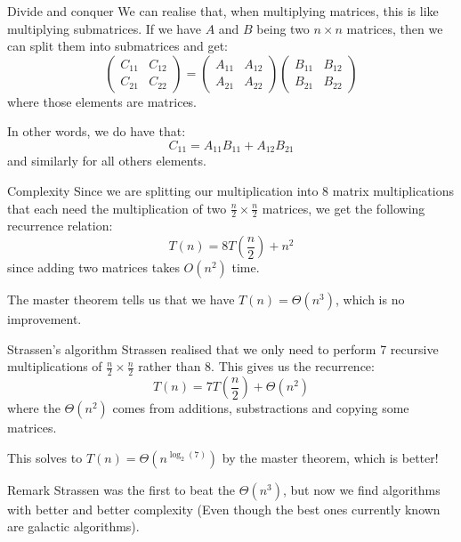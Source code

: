 \documentclass[a4paper]{article}
\begin{document}
\begin{parag}{Divide and conquer}
    We can realise that, when multiplying matrices, this is like multiplying submatrices. If we have $A$ and $B$ being two $n \times n$ matrices, then we can split them into submatrices and get: 
    \[\begin{pmatrix} C_{11} & C_{12} \\ C_{21}  & C_{22} \end{pmatrix} = \begin{pmatrix} A_{11} & A_{12} \\ A_{21} & A_{22} \end{pmatrix} \begin{pmatrix} B_{11} & B_{12} \\ B_{21} & B_{22} \end{pmatrix} \]
    where those elements are matrices.

    In other words, we do have that:
    \[C_{11} = A_{11} B_{11} + A_{12} B_{21}\]
    and similarly for all others elements.

    \begin{subparag}{Complexity}
        Since we are splitting our multiplication into 8 matrix multiplications that each need the multiplication of two $\frac{n}{2} \times \frac{n}{2}$ matrices, we get the following recurrence relation: 
        \[T\left(n\right) = 8T\left(\frac{n}{2}\right) + n^2\]
        since adding two matrices takes $O\left(n^2\right)$ time.

        The master theorem tells us that we have $T\left(n\right) = \Theta\left(n^3\right)$, which is no improvement.
    \end{subparag}
\end{parag}

\begin{parag}{Strassen's algorithm}
    Strassen realised that we only need to perform 7 recursive multiplications of $\frac{n}{2} \times \frac{n}{2}$ rather than $8$. This gives us the recurrence: 
    \[T\left(n\right) = 7T\left(\frac{n}{2}\right) + \Theta\left(n^2\right)\]
    where the $\Theta\left(n^2\right)$ comes from additions, substractions and copying some matrices.
    
    This solves to $T\left(n\right) = \Theta\left(n^{\log_2\left(7\right)}\right)$ by the master theorem, which is better!
\end{parag}

\begin{parag}{Remark}
    Strassen was the first to beat the $\Theta\left(n^3\right)$, but now we find algorithms with better and better complexity (Even though the best ones currently known are galactic algorithms).
\end{parag}
\end{document}
